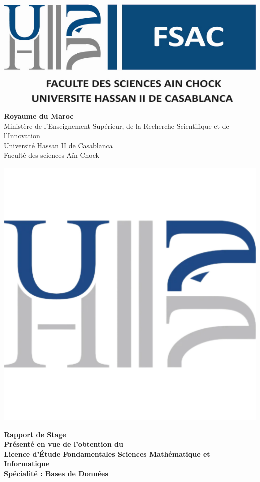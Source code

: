 \begin{minipage}[1]{0.2\columnwidth}
    \includegraphics[width=\columnwidth]{images/fsac.pdf}
\end{minipage}
\hfill
\begin{minipage}[1]{0.4\columnwidth}
    \centering
    \textbf{Royaume du Maroc}\\
    Ministère de l’Enseignement Supérieur, de la Recherche Scientifique et de l'Innovation\\[.25cm]
    Université Hassan II de Casablanca\\
    Faculté des sciences Aïn Chock\\
\end{minipage}
\hfill
\begin{minipage}[1]{0.2\columnwidth}
    \includegraphics[width=.75\columnwidth]{images/univh2.pdf}
\end{minipage}

\begin{center}
  \vspace{2cm}
    {\LARGE{\textbf{Rapport de Stage}}}\\
    \vskip1cm
    \large
    {\textbf{Présenté en vue de l'obtention du}}\\
    \vskip2mm
    {\textbf{Licence d'\'Etude Fondamentales Sciences Mathématique et Informatique}}\\
    {\textbf{Spécialité : Bases de Données}}\\
\end{center}


